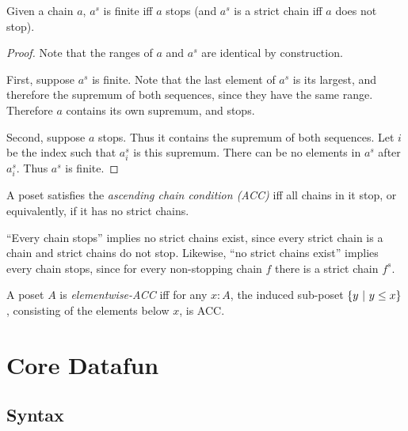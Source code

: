\documentclass{article}
\begin{document}
\begin{lemma}
  Given a chain $a$, $a^s$ is finite iff $a$ stops (and $a^s$ is a strict chain
  iff $a$ does not stop).
\end{lemma}
\begin{proof}
  Note that the ranges of $a$ and $a^s$ are identical by construction.

  First, suppose $a^s$ is finite. Note that the last element of $a^s$ is its
  largest, and therefore the supremum of both sequences, since they have the
  same range. Therefore $a$ contains its own supremum, and stops.

  Second, suppose $a$ stops. Thus it contains the supremum of both sequences.
  Let $i$ be the index such that $a^s_i$ is this supremum. There can be no
  elements in $a^s$ after $a^s_i$. Thus $a^s$ is finite.
\end{proof}

\begin{definition}[ACC]
  A poset satisfies the \emph{ascending chain condition (ACC)} iff all chains in
  it stop, or equivalently, if it has no strict chains.
\end{definition}

``Every chain stops'' implies no strict chains exist, since every strict chain
is a chain and strict chains do not stop. Likewise, ``no strict chains exist''
implies every chain stops, since for every non-stopping chain $f$ there is a
strict chain $f^s$.

\begin{definition}
  A poset $A$ is \emph{elementwise-ACC} iff for any $x : A$, the induced
  sub-poset $\{{{y}~|~{y \le x}}\}$, consisting of the elements below $x$, is ACC.
\end{definition}


\section{Core Datafun}

\subsection{Syntax}
\end{document}
